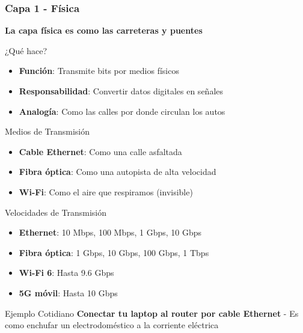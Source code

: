 \documentclass[aspectratio=169]{beamer}
\begin{document}
            \begin{frame}
            \frametitle{Capa 1 - Física}
            
            \begin{center}
            \Large \textbf{La capa física es como las carreteras y puentes}
            \end{center}
            
            \begin{block}{¿Qué hace?}
            \begin{itemize}
            \item \textbf{Función}: Transmite bits por medios físicos
            \item \textbf{Responsabilidad}: Convertir datos digitales en señales
            \item \textbf{Analogía}: Como las calles por donde circulan los autos
            \end{itemize}
            \end{block}
            
            \begin{block}{Medios de Transmisión}
            \begin{itemize}
            \item \textbf{Cable Ethernet}: Como una calle asfaltada
            \item \textbf{Fibra óptica}: Como una autopista de alta velocidad
            \item \textbf{Wi-Fi}: Como el aire que respiramos (invisible)
            \end{itemize}
            \end{block}
            
            \begin{block}{Velocidades de Transmisión}
            \begin{itemize}
            \item \textbf{Ethernet}: 10 Mbps, 100 Mbps, 1 Gbps, 10 Gbps
            \item \textbf{Fibra óptica}: 1 Gbps, 10 Gbps, 100 Gbps, 1 Tbps
            \item \textbf{Wi-Fi 6}: Hasta 9.6 Gbps
            \item \textbf{5G móvil}: Hasta 10 Gbps
            \end{itemize}
            \end{block}
            
            \begin{block}{Ejemplo Cotidiano}
            \textbf{Conectar tu laptop al router por cable Ethernet} - Es como enchufar 
un electrodoméstico a la corriente eléctrica
            \end{block}
            \end{frame}
            
\end{document}
